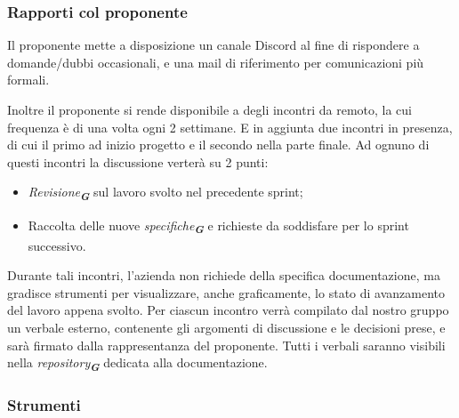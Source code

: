 \subsubsection{Rapporti col proponente}
Il proponente mette a disposizione un canale Discord al fine di rispondere a domande/dubbi occasionali, e una mail di riferimento per comunicazioni più formali.

Inoltre il proponente si rende disponibile a degli incontri da remoto, la cui frequenza è di una volta ogni 2 settimane.
E in aggiunta due incontri in presenza, di cui il primo ad inizio progetto e il secondo nella parte finale.
Ad ognuno di questi incontri la discussione verterà su 2 punti:
\begin{itemize}
    \item \emph{Revisione}\textsubscript{\textit{\textbf{G}}} sul lavoro svolto nel precedente sprint;
    \item Raccolta delle nuove \emph{specifiche}\textsubscript{\textit{\textbf{G}}} e richieste da soddisfare per lo sprint successivo.
\end{itemize}
Durante tali incontri, l’azienda non richiede della specifica documentazione, ma gradisce strumenti per visualizzare, anche graficamente, lo stato di avanzamento del lavoro appena svolto.
Per ciascun incontro verrà compilato dal nostro gruppo un verbale esterno, contenente gli argomenti di discussione e le decisioni prese, e sarà firmato dalla rappresentanza del proponente.
Tutti i verbali saranno visibili nella \emph{repository}\textsubscript{\textit{\textbf{G}}} dedicata alla documentazione.

\subsubsection{Strumenti}

